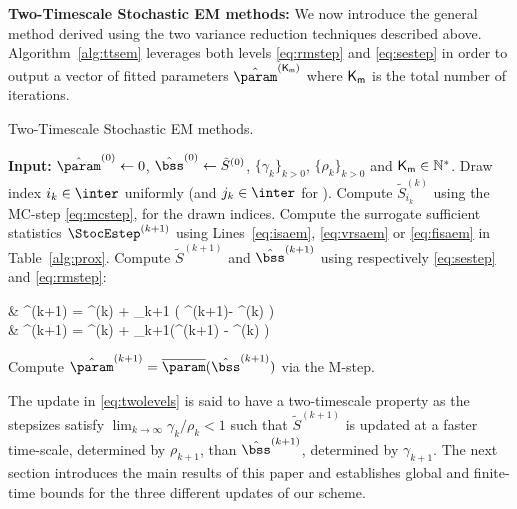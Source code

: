 \documentclass[11pt]{article}
\theoremstyle{t}
\begin{document}
\textbf{Two-Timescale Stochastic EM methods:}
We now introduce the general method derived using the two variance reduction techniques described above.
Algorithm~\ref{alg:ttsem} leverages both levels \eqref{eq:rmstep} and \eqref{eq:sestep} in order to output a vector of fitted parameters $\hat{\param}^{({\sf K}_{\sf m })}$ where ${\sf K}_{\sf m }$ is the total number of iterations.
\begin{algorithm}[H]
\caption{Two-Timescale Stochastic EM methods.}\label{alg:ttsem}
  \begin{algorithmic}[1]
  \STATE \textbf{Input:} $\hat{\param}^{(0)} \leftarrow 0$, $\hat{\bss}^{(0)} \leftarrow \tilde{S}^{(0)}$, $\{\gamma_k\}_{k>0}$, $\{\rho_k\}_{k>0}$ and $ {\sf K}_{\sf m }\in \mathbb{N}^*$.
  \STATE Draw index $i_k \in \inter$ uniformly (and $j_k \in \inter$ for \FISAEM).
     \STATE Compute $\tilde{S}_{i_k}^{(k)}$ using the {\sf MC-step} \eqref{eq:mcstep},  for the drawn indices.
   \STATE Compute the surrogate sufficient statistics $\StocEstep^{(k+1)}$ using Lines~\ref{eq:isaem}, \ref{eq:vrsaem} or \ref{eq:fisaem} in Table~\ref{alg:prox}.
   \STATE Compute $\tilde{S}^{(k+1)}$ and $\hat{\bss}^{(k+1)}$ using respectively \eqref{eq:sestep} and \eqref{eq:rmstep}:
\beq \label{eq:twolevels}
\begin{split}
& ^{(k+1)} = ^{(k)} + \rho_{k+1} \big( \StocEstep^{(k+1)}- ^{(k)}  \big)\\
&  \hat{\bss}^{(k+1)} =  \hat{\bss}^{(k)}  + \gamma_{k+1}(^{(k+1)} - \hat{\bss}^{(k)} )
\end{split}
\eeq
   \STATE Compute $\hat{\param}^{(k+1)} = \overline{\param}(  \hat{\bss}^{(k+1)}) $ via the {\sf M-step}.
\ENDFOR
  \end{algorithmic}
\end{algorithm}\vspace{-0.1in}
The update in \eqref{eq:twolevels} is said to have a two-timescale property as the stepsizes satisfy $\lim_{k \to \infty} \gamma_k/\rho_k < 1$ such that $ \tilde{S}^{(k+1)} $  is updated at a faster time-scale, determined by $\rho_{k+1}$, than $\hat{\bss}^{(k+1)}$, determined by $\gamma_{k+1}$.
The next section introduces the main results of this paper and establishes global and finite-time bounds for the three different updates of our scheme.
\end{document}
